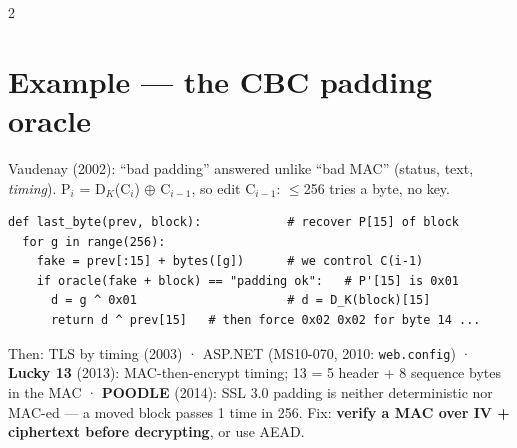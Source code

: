 \documentclass[8pt]{extarticle}
\newcommand\ct[1]{\texttt{#1}}
\begin{document}
\begin{multicols}{2}
\section{Example — the CBC padding oracle}
Vaudenay (2002): ``bad padding'' answered unlike ``bad MAC'' (status, text, \emph{timing}).
P$_i$ = D$_K$(C$_i$) $\oplus$ C$_{i-1}$, so edit C$_{i-1}$: $\le$256 tries a byte, no key.
\begin{lstlisting}[language=PseudoSheet]
def last_byte(prev, block):            # recover P[15] of block
  for g in range(256):
    fake = prev[:15] + bytes([g])      # we control C(i-1)
    if oracle(fake + block) == "padding ok":   # P'[15] is 0x01
      d = g ^ 0x01                     # d = D_K(block)[15]
      return d ^ prev[15]   # then force 0x02 0x02 for byte 14 ...
\end{lstlisting}
Then: TLS by timing (2003) · ASP.NET (MS10-070, 2010: \ct{web.config}) · \textbf{Lucky 13} (2013): MAC-then-encrypt timing; 13 = 5 header + 8 sequence bytes in the MAC ·
\textbf{POODLE} (2014): SSL 3.0 padding is neither deterministic nor MAC-ed — a moved block passes
1 time in 256. Fix: \textbf{verify a MAC over IV + ciphertext before decrypting}, or use AEAD.


\end{multicols}
\end{document}
